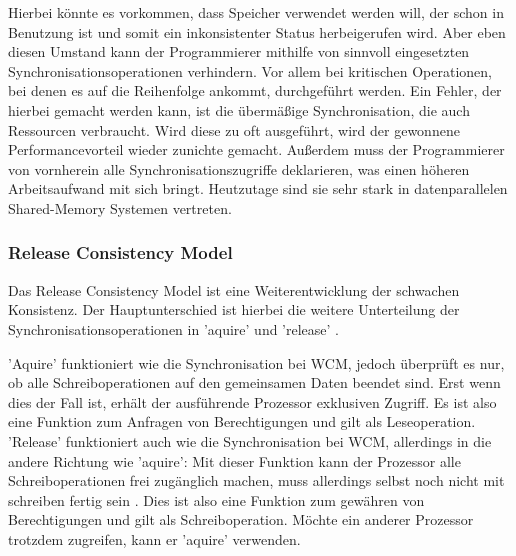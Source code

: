\documentclass[final,bibliography=totocnumbered]{include/sikseminar}
\begin{document}
Hierbei könnte es  vorkommen, dass Speicher verwendet werden will, der schon in Benutzung ist und somit ein inkonsistenter Status herbeigerufen wird. Aber eben diesen Umstand kann der Programmierer mithilfe 
von sinnvoll eingesetzten Synchronisationsoperationen verhindern. Vor allem bei kritischen Operationen, bei denen es auf die Reihenfolge ankommt,
durchgeführt werden.
Ein Fehler, der hierbei gemacht werden kann, ist die übermäßige Synchronisation, die auch Ressourcen verbraucht. Wird diese zu oft ausgeführt, wird der gewonnene Performancevorteil wieder zunichte gemacht. Außerdem muss der Programmierer von vornherein alle Synchronisationszugriffe deklarieren, was einen höheren Arbeitsaufwand mit sich bringt.
Heutzutage sind sie sehr stark in datenparallelen Shared-Memory Systemen vertreten.





	\subsubsection{Release Consistency Model}

Das Release Consistency Model ist eine Weiterentwicklung der schwachen Konsistenz. Der Hauptunterschied ist hierbei die weitere Unterteilung der Synchronisationsoperationen in 'aquire' und 'release' \cite{smcmtutorial}.

'Aquire' funktioniert wie die Synchronisation bei WCM, jedoch überprüft es nur, ob alle Schreiboperationen auf den gemeinsamen Daten beendet sind. Erst wenn dies der Fall ist, erhält der ausführende Prozessor exklusiven Zugriff. Es ist also eine Funktion zum Anfragen von Berechtigungen und gilt als Leseoperation.
'Release' funktioniert auch wie die Synchronisation bei WCM, allerdings in die andere Richtung wie 'aquire': Mit dieser Funktion kann der Prozessor alle Schreiboperationen frei zugänglich machen, muss allerdings selbst noch nicht mit schreiben fertig sein \cite{mcm,designingmcm}. Dies ist also eine Funktion zum gewähren von Berechtigungen und gilt als Schreiboperation.
Möchte ein anderer Prozessor trotzdem zugreifen, kann er 'aquire' verwenden. 
\end{document}
